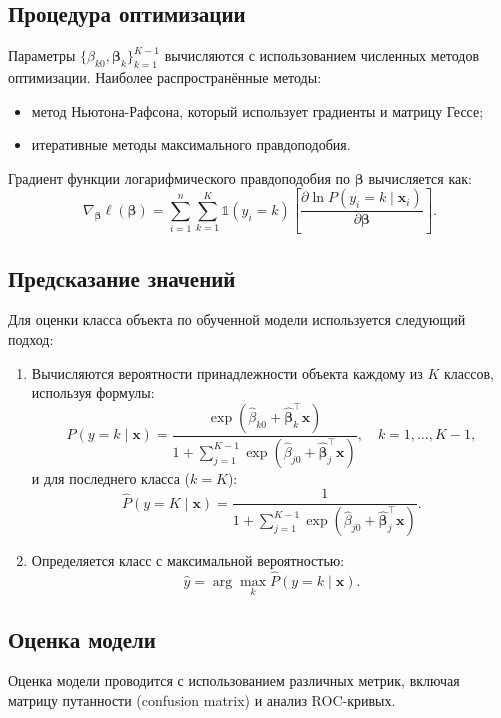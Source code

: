 \subsection{Процедура оптимизации}
Параметры \( \{\beta_{k0}, \mathbf{\beta}_k\}_{k=1}^{K-1} \) вычисляются с использованием численных методов оптимизации. Наиболее распространённые методы:
\begin{itemize}
	\item метод Ньютона-Рафсона, который использует градиенты и матрицу Гессе;
	\item итеративные методы максимального правдоподобия.
\end{itemize}

Градиент функции логарифмического правдоподобия по \( \boldsymbol{\beta} \) вычисляется как:
\[
\nabla_{\boldsymbol{\beta}} \ell(\boldsymbol{\beta}) = \sum_{i=1}^n \sum_{k=1}^K \mathbb{1}(y_i = k) 
\left[ \frac{\partial \ln P(y_i = k \mid \mathbf{x}_i)}{\partial \boldsymbol{\beta}} \right].
\]

\subsection{Предсказание значений}
Для оценки класса объекта по обученной модели используется следующий подход:

\begin{enumerate}
	\item Вычисляются вероятности принадлежности объекта каждому из \( K \) классов, используя формулы:
	\[
	\hat{P}(y = k \mid \mathbf{x}) = 
	\frac{\exp(\hat{\beta}_{k0} + \hat{\mathbf{\beta}}_k^\top \mathbf{x})}{
		1 + \sum_{j=1}^{K-1} \exp(\hat{\beta}_{j0} + \hat{\mathbf{\beta}}_j^\top \mathbf{x})}, 
	\quad k = 1, \dots, K-1,
	\]
	и для последнего класса (\( k = K \)):
	\[
	\hat{P}(y = K \mid \mathbf{x}) = \frac{1}{
		1 + \sum_{j=1}^{K-1} \exp(\hat{\beta}_{j0} + \hat{\mathbf{\beta}}_j^\top \mathbf{x})}.
	\]
	
	\item Определяется класс с максимальной вероятностью:
	\[
	\hat{y} = \arg\max_k \hat{P}(y = k \mid \mathbf{x}).
	\]
\end{enumerate}

\subsection{Оценка модели}
Оценка модели проводится с использованием различных метрик, включая матрицу путанности (confusion matrix) и анализ ROC-кривых. 

